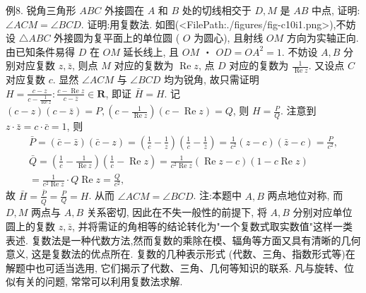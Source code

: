 例8. 锐角三角形 $A B C$ 外接圆在 $A$ 和 $B$ 处的切线相交于 $D, M$ 是 $A B$ 中点, 证明: $\angle A C M=\angle B C D$. 
证明:用复数法.
如图(<FilePath:./figures/fig-c10i1.png>),不妨设 $\triangle A B C$ 外接圆为复平面上的单位圆 ( $O$ 为圆心), 且射线 $O M$ 方向为实轴正向.
由已知条件易得 $D$ 在 $O M$ 延长线上, 且 $O M$ ・ $O D=O A^2=1$.
不妨设 $A, B$ 分别对应复数 $z, \bar{z}$, 则点 $M$ 对应的复数为 $\operatorname{Re} z$, 点 $D$ 对应的复数为 $\frac{1}{\operatorname{Re} z}$. 又设点 $C$ 对应复数 $c$.
显然 $\angle A C M$ 与 $\angle B C D$ 均为锐角, 故只需证明 $H=\frac{c-z}{c-\frac{1}{\operatorname{Re} z}}: \frac{c-\operatorname{Re} z}{c-\bar{z}} \in \mathbf{R}$, 即证 $\bar{H}=H$.
记 $(c-z)(c-\bar{z})=P,\left(c-\frac{1}{\operatorname{Re} z}\right)(c-\operatorname{Re} z)=Q$, 则 $H=\frac{P}{Q}$.
注意到 $z \cdot \bar{z}=c \cdot \bar{c}=1$, 则
$$
\begin{gathered}
\bar{P}=(\bar{c}-\bar{z})(\bar{c}-z)=\left(\frac{1}{c}-\frac{1}{z}\right)\left(\frac{1}{c}-\frac{1}{\bar{z}}\right)=\frac{1}{c^2}(z-c)(\bar{z}-c)=\frac{P}{c^2}, \\
\bar{Q}=\left(\frac{1}{c}-\frac{1}{\operatorname{Re} z}\right)\left(\frac{1}{c}-\operatorname{Re} z\right)=\frac{1}{c^2 \operatorname{Re} z}(\operatorname{Re} z-c)(1-c \operatorname{Re} z) \\
=\frac{1}{c^2 \operatorname{Re} z} \cdot Q \operatorname{Re} z=\frac{Q}{c^2},
\end{gathered}
$$
故 $\bar{H}=\frac{\bar{P}}{\bar{Q}}=\frac{P}{Q}=H$. 从而 $\angle A C M=\angle B C D$.
注:本题中 $A, B$ 两点地位对称, 而 $D, M$ 两点与 $A, B$ 关系密切, 因此在不失一般性的前提下, 将 $A, B$ 分别对应单位圆上的复数 $z, \bar{z}$, 并将需证的角相等的结论转化为"一个复数式取实数值"这样一类表述.
复数法是一种代数方法,然而复数的乘除在模、辐角等方面又具有清晰的几何意义, 这是复数法的优点所在.
复数的几种表示形式 (代数、三角、指数形式等)在解题中也可适当选用, 它们揭示了代数、三角、几何等知识的联系.
凡与旋转、位似有关的问题, 常常可以利用复数法求解.



